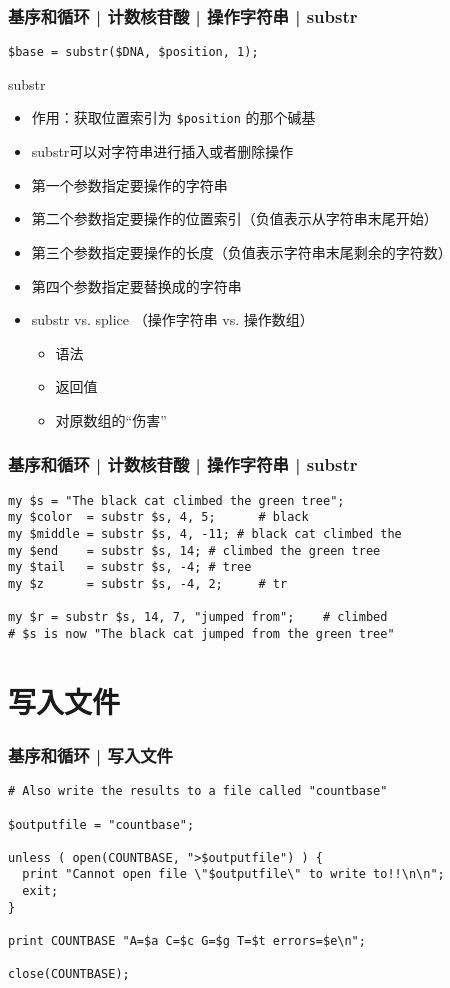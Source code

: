 \begin{frame}[fragile]
  \frametitle{基序和循环 | 计数核苷酸 | 操作字符串 | \alert{substr}}
\begin{lstlisting}
$base = substr($DNA, $position, 1);
\end{lstlisting}
\pause
\begin{block}{substr}
  \begin{itemize}
    \item 作用：获取位置索引为 \verb|$position| 的那个碱基
    \item substr可以对字符串进行插入或者删除操作
    \item 第一个参数指定要操作的字符串
    \item 第二个参数指定要操作的位置索引（负值表示从字符串末尾开始）
    \item 第三个参数指定要操作的长度（负值表示字符串末尾剩余的字符数）
    \item 第四个参数指定要替换成的字符串
    \item substr vs. splice （操作字符串 vs. 操作数组）
      \begin{itemize}
        \item 语法
        \item 返回值
        \item 对原数组的“伤害”
      \end{itemize}
  \end{itemize}
\end{block}
\end{frame}

\begin{frame}[fragile]
  \frametitle{基序和循环 | 计数核苷酸 | 操作字符串 | \alert{substr}}
\begin{lstlisting}
my $s = "The black cat climbed the green tree";
my $color  = substr $s, 4, 5;      # black
my $middle = substr $s, 4, -11; # black cat climbed the
my $end    = substr $s, 14; # climbed the green tree
my $tail   = substr $s, -4; # tree
my $z      = substr $s, -4, 2;     # tr

my $r = substr $s, 14, 7, "jumped from";    # climbed
# $s is now "The black cat jumped from the green tree"
\end{lstlisting}
\end{frame}

\section{写入文件}
\begin{frame}[fragile]
  \frametitle{基序和循环 | \alert{写入文件}}
\begin{lstlisting}
# Also write the results to a file called "countbase"

$outputfile = "countbase";

unless ( open(COUNTBASE, ">$outputfile") ) {
  print "Cannot open file \"$outputfile\" to write to!!\n\n";
  exit;
}

print COUNTBASE "A=$a C=$c G=$g T=$t errors=$e\n";

close(COUNTBASE);
\end{lstlisting}
\end{frame}

